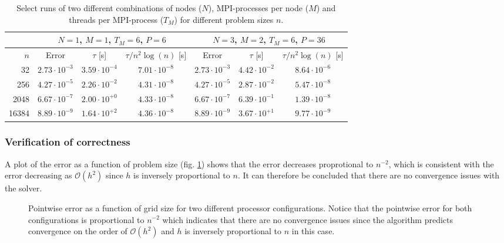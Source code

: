 \documentclass[11pt,a4paper,english]{article}
\numberwithin{figure}{subsection}
\numberwithin{table}{subsection}
\begin{document}
\begin{table}[hb]
\caption{Select runs of two different combinations of nodes ($N$), MPI-processes per node ($M$) and threads per MPI-process ($T_M$) for different problem sizes $n$. }
\centering
	\begin{tabular}{r||c|c|c||c|c|c}
\multicolumn{1}{c}{}& \multicolumn{3}{c||}{$N=1$, $M=1$, $T_M=6$, $P=6$}&\multicolumn{3}{c}{$N=3$, $M=2$, $T_M=6$, $P=36$} \\
\hline
$n$ & Error & $\tau$ [s]& ${\tau}/{n^2\log(n)}$ [s]& Error & $\tau$ [s]& ${\tau}/{n^2\log(n)}$ [s]\\ 
\hline
32		& $2.73\cdot10^{-3}$ & $3.59\cdot10^{-4}$ & $7.01\cdot10^{-8}$ & $2.73\cdot10^{-3}$ 	& $4.42\cdot10^{-2}$	&  $8.64\cdot10^{-6}$\\ 

256		& $4.27\cdot10^{-5}$ & $2.26\cdot10^{-2}$ & $4.31\cdot10^{-8} $ & $4.27\cdot10^{-5}$ 	& $2.87\cdot10^{-2}$	&  $5.47\cdot10^{-8}$\\ 

2048	& $6.67\cdot10^{-7}$ & $2.00\cdot10^{+0} $ & $4.33\cdot10^{-8} $ & $6.67\cdot10^{-7}$	& $6.39\cdot10^{-1} $	&  $1.39\cdot10^{-8}$\\ 

16384	& $8.89\cdot10^{-9}$ & $1.64\cdot10^{+2} $ & $4.36\cdot10^{-8} $ & $8.89\cdot10^{-9}$	& $3.67\cdot10^{+1}$	&  $9.77\cdot10^{-9}$\\ 
	\end{tabular} 
	\label{tab:errorresults}
\end{table}

\subsubsection{Verification of correctness}
A plot of the error as a function of problem size (fig. \ref{fig:error}) shows that the error decreases proprotional to $n^{-2}$, which is consistent with the error decreasing as $\mathcal{O}(h^2)$ since $h$ is inversely proportional to $n$. It can therefore be concluded that there are no convergence issues with the solver.

\begin{figure}[tbp]
	\centering
	
	\caption{Pointwise error as a function of grid size for two different processor configurations. Notice that the pointwise error for both configurations is proportional to $n^{-2}$ which indicates that there are no convergence issues since the algorithm predicts convergence on the order of $\mathcal{O}(h^2)$ and $h$ is inversely proportional to $n$ in this case.}
	\label{fig:error}
\end{figure}
\end{document}
